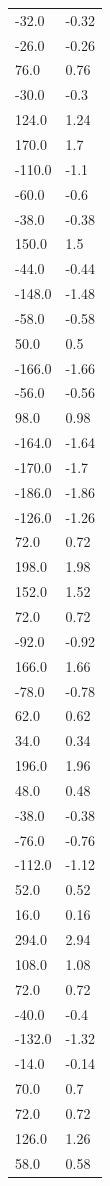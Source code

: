 \begin{longtable}{ll}
-32.0 & -0.32 \\
-26.0 & -0.26 \\
76.0 & 0.76 \\
-30.0 & -0.3 \\
124.0 & 1.24 \\
170.0 & 1.7 \\
-110.0 & -1.1 \\
-60.0 & -0.6 \\
-38.0 & -0.38 \\
150.0 & 1.5 \\
-44.0 & -0.44 \\
-148.0 & -1.48 \\
-58.0 & -0.58 \\
50.0 & 0.5 \\
-166.0 & -1.66 \\
-56.0 & -0.56 \\
98.0 & 0.98 \\
-164.0 & -1.64 \\
-170.0 & -1.7 \\
-186.0 & -1.86 \\
-126.0 & -1.26 \\
72.0 & 0.72 \\
198.0 & 1.98 \\
152.0 & 1.52 \\
72.0 & 0.72 \\
-92.0 & -0.92 \\
166.0 & 1.66 \\
-78.0 & -0.78 \\
62.0 & 0.62 \\
34.0 & 0.34 \\
196.0 & 1.96 \\
48.0 & 0.48 \\
-38.0 & -0.38 \\
-76.0 & -0.76 \\
-112.0 & -1.12 \\
52.0 & 0.52 \\
16.0 & 0.16 \\
294.0 & 2.94 \\
108.0 & 1.08 \\
72.0 & 0.72 \\
-40.0 & -0.4 \\
-132.0 & -1.32 \\
-14.0 & -0.14 \\
70.0 & 0.7 \\
72.0 & 0.72 \\
126.0 & 1.26 \\
58.0 & 0.58 \\

\end{longtable}
